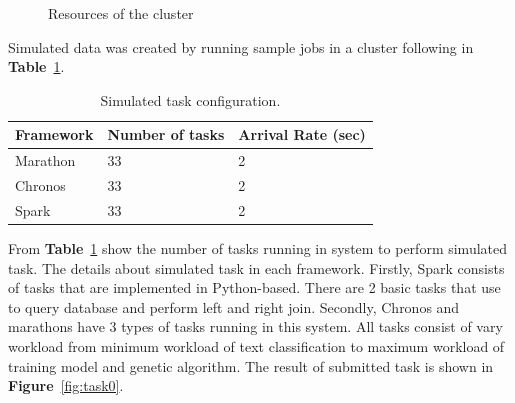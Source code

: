 \documentclass[12pt,oneside,openright,a4paper]{cpe-english-project}
\begin{document}
\begin{figure}[!h]\centering
    \setlength{\fboxrule}{0mm} %
    \setlength{\fboxsep}{0cm}
    \caption{Resources of the cluster}\label{fig:resourcesCluster}
\end{figure}

Simulated data was created by running sample jobs in a cluster following in \textbf{Table}~\ref{tbl:SimulatedTaskConfiguration}.

\begin{table}[!h]
  \caption{Simulated task configuration.}\label{tbl:SimulatedTaskConfiguration}
  \begin{tabular}{@{}|p{}|p{}|p{}|}
    \hline
    \textbf{Framework} & \textbf{Number of tasks} & \textbf{Arrival Rate (sec)} \\
    \hline
    Marathon & 33 & 2 \\
    \hline
    Chronos & 33 & 2 \\ 
    \hline
    Spark & 33 & 2\\
    \hline                          
  \end{tabular}
\end{table}

\hspace{10mm}From \textbf{Table}~\ref{tbl:SimulatedTaskConfiguration} show the number of tasks running in system to perform simulated task. The details about simulated task in each framework. Firstly, Spark consists of tasks that are implemented in Python-based. There are 2 basic tasks that use to query database and perform left and right join. Secondly, Chronos and marathons have 3 types of tasks running in this system. All tasks consist of vary workload from minimum workload of text classification to maximum workload of training model and genetic algorithm. The result of submitted task is shown in \textbf{Figure}~\ref{fig:task0}.
\end{document}
